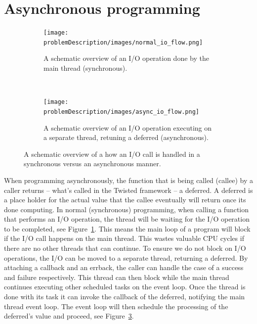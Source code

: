 \section{Asynchronous programming}

\begin{figure}
	\centering
	\begin{subfigure}[b]{\textwidth}
		\texttt{[image: problemDescription/images/normal\_io\_flow.png]}
		\caption{A schematic overview of an I/O operation done by the main thread (synchronous).}
		\label{fig:normal_io_flow}
	\end{subfigure}
	~ %
	\begin{subfigure}[b]{\textwidth}
		\texttt{[image: problemDescription/images/async\_io\_flow.png]}
		\caption{A schematic overview of an I/O operation executing on a separate thread, retuning a deferred (asynchronous).}
		\label{fig:async_io_flow}
	\end{subfigure}
	\caption{A schematic overview of a how an I/O call is handled in a synchronous versus an asynchronous manner.}
\end{figure}


When programming asynchronously, the function that is being called (callee) by a caller returns -- what's called in the Twisted framework -- a deferred.
A deferred is a place holder for the actual value that the callee eventually will return once its done computing.
In normal (synchronous) programming, when calling a function that performs an I/O operation, the thread will be waiting for the I/O operation to be completed, see Figure~\ref{fig:normal_io_flow}.
This means the main loop of a program will block if the I/O call happens on the main thread.
This wastes valuable CPU cycles if there are no other threads that can continue.
To ensure we do not block on I/O operations, the I/O can be moved to a separate thread, returning a deferred.
By attaching a callback and an errback, the caller can handle the case of a success and failure respectively.
This thread can then block while the main thread continues executing other scheduled tasks on the event loop.
Once the thread is done with its task it can invoke the callback of the deferred, notifying the main thread event loop.
The event loop will then schedule the processing of the deferred's value and proceed, see Figure~\ref{fig:async_io_flow}.

